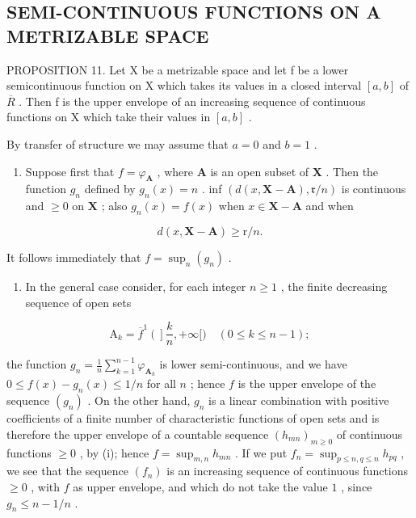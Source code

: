 \subsection{SEMI-CONTINUOUS FUNCTIONS ON A METRIZABLE SPACE}

PROPOSITION 11. Let X be a metrizable space and let f be a lower semicontinuous function on X which takes its values in a closed interval \([a, b]\) of \(\overline{R}\) . Then f is the upper envelope of an increasing sequence of continuous functions on X which take their values in \([a, b]\) .

By transfer of structure we may assume that \(a = 0\) and \(b = 1\) .

\begin{enumerate}
\def\labelenumi{(\roman{enumi})}
\tightlist
\item
  Suppose first that \(f = \varphi_{\mathbf{A}}\) , where \(\mathbf{A}\) is an open subset of \(\mathbf{X}\) . Then the function \(g_n\) defined by \(g_n(x) = n\) . inf \((d(x, \mathbf{X} - \mathbf{A}), \mathfrak{r}/n)\) is continuous and \(\geqslant 0\) on \(\mathbf{X}\) ; also \(g_n(x) = f(x)\) when \(x \in \mathbf{X} - \mathbf{A}\) and when
\end{enumerate}

\[
d (x, \mathbf {X} - \mathbf {A}) \geqslant \mathrm{r} / n.
\]

It follows immediately that \(f = \sup_{n}(g_n)\) .

\begin{enumerate}
\def\labelenumi{(\roman{enumi})}
\setcounter{enumi}{1}
\tightlist
\item
  In the general case consider, for each integer \(n \geqslant 1\) , the finite decreasing sequence of open sets
\end{enumerate}

\[
\mathrm{A} _ {k} = \overline {{{f}}} ^ {1} \left(\right] \frac {k}{n}, + \infty [) \quad (0 \leqslant k \leqslant n - 1);
\]

the function \(g_{n} = \frac{1}{n}\sum_{k=1}^{n-1}\varphi_{\mathbf{A}_k}\) is lower semi-continuous, and we have \(0 \leqslant f(x) - g_{n}(x) \leqslant 1/n\) for all \(n\) ; hence \(f\) is the upper envelope of the sequence \((g_n)\) . On the other hand, \(g_{n}\) is a linear combination with positive coefficients of a finite number of characteristic functions of open sets and is therefore the upper envelope of a countable sequence \((h_{mn})_{m \geqslant 0}\) of continuous functions \(\geqslant 0\) , by (i); hence \(f = \sup_{m,n} h_{mn}\) . If we put \(f_{n} = \sup_{p \leqslant n, q \leqslant n} h_{pq}\) , we see that the sequence \((f_n)\) is an increasing sequence of continuous functions \(\geqslant 0\) , with \(f\) as upper envelope, and which do not take the value \(1\) , since \(g_{n} \leqslant n - 1/n\) .

